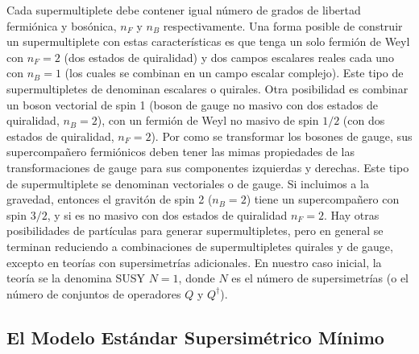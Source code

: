 Cada supermultiplete debe contener igual número de grados de libertad fermiónica y bosónica, $n_F$ y $n_B$ respectivamente. Una forma posible de construir un supermultiplete con estas características es que tenga un solo fermión de Weyl con $n_F=2$ (dos estados de quiralidad)
y dos campos escalares reales cada uno con $n_B=1$ (los cuales se combinan en un campo escalar complejo). Este tipo de supermultipletes de denominan escalares o quirales. Otra posibilidad es combinar un boson vectorial de spin 1 (boson de gauge no masivo con dos estados de quiralidad, $n_B=2$), con un fermión de Weyl no masivo de spin $1/2$ (con dos estados de quiralidad, $n_F=2$). Por como se transformar los bosones de gauge, sus supercompañero fermiónicos deben tener las mimas propiedades de las transformaciones de gauge para sus componentes izquierdas y derechas. Este tipo de supermultiplete se denominan vectoriales o de gauge. Si incluimos a la gravedad, entonces el gravitón de spin 2 ($n_B=2$) tiene un supercompañero con spin $3/2$, y si es no masivo con dos estados de quiralidad $n_F=2$. Hay otras posibilidades de partículas para generar supermultipletes, pero en general se terminan reduciendo a combinaciones de supermultipletes quirales y de gauge, excepto en teorías con supersimetrías adicionales. En nuestro caso inicial, la teoría se la denomina SUSY $N=1$, donde $N$ es el número de supersimetrías (o el número de conjuntos de operadores $Q$ y $Q^{\dagger}$). 

\subsection{El Modelo Estándar Supersimétrico Mínimo}

